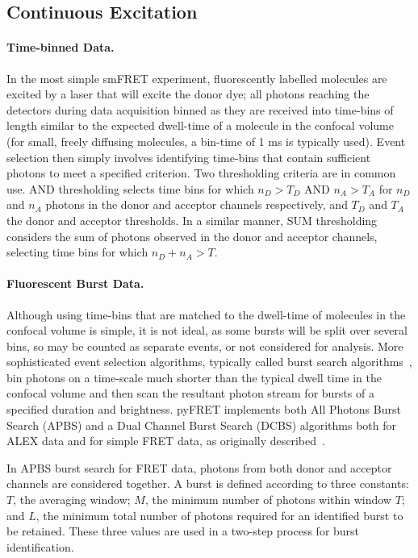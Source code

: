 \subsection{Continuous Excitation}
\paragraph{Time-binned Data.}
In the most simple smFRET experiment, fluorescently labelled molecules are excited by a laser that will excite the donor dye; all photons reaching the detectors during data acquisition binned as they are received into time-bins of length similar to the expected dwell-time of a molecule in the confocal volume (for small, freely diffusing molecules, a bin-time of 1 ms is typically used). Event selection then simply involves identifying time-bins that contain sufficient photons to meet a specified criterion. Two thresholding criteria are in common use. AND thresholding selects time bins for which $n_D > T_D$ AND $n_A > T_A$ for $n_D$ and $n_A$ photons in the donor and acceptor channels respectively, and $T_D$ and $T_A$ the donor and acceptor thresholds. In a similar manner, SUM thresholding considers the sum of photons observed in the donor and acceptor channels, selecting time bins for which $n_D + n_A > T$.

\paragraph{Fluorescent Burst Data.}
Although using time-bins that are matched to the dwell-time of molecules in the confocal volume is simple, it is not ideal, as some bursts will be split over several bins, so may be counted as separate events, or not considered for analysis. More sophisticated event selection algorithms, typically called burst search algorithms~\cite{nir06}, bin photons on a time-scale much shorter than the typical dwell time in the confocal volume and then scan the resultant photon stream for bursts of a specified duration and brightness. pyFRET implements both All Photons Burst Search (APBS) and a Dual Channel Burst Search (DCBS) algorithms both for ALEX data and for simple FRET data, as originally described~\cite{nir06}.

In APBS burst search for FRET data, photons from both donor and acceptor channels are considered together. A burst is defined according to three constants: $T$, the averaging window; $M$, the minimum number of photons within window $T$; and $L$, the minimum total number of photons required for an identified burst to be retained. These three values are used in a two-step process for burst identification.

